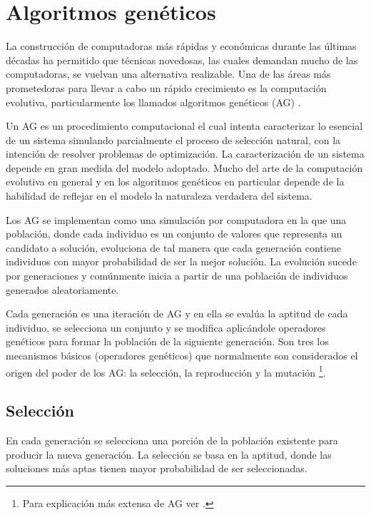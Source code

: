 \section{Algoritmos gen\'eticos}
La construcci\'on de computadoras m\'as r\'apidas y econ\'omicas 
durante las \'ultimas d\'ecadas ha permitido que t\'ecnicas 
novedosas, las cuales demandan mucho de las computadoras, se vuelvan 
una alternativa realizable. Una de las \'areas m\'as prometedoras 
para llevar a cabo un r\'apido crecimiento es la computaci\'on 
evolutiva, particularmente los llamados algoritmos gen\'eticos (AG) 
\citep{Kur199901}.

Un AG es un procedimiento computacional el cual intenta caracterizar 
lo esencial de un sistema simulando parcialmente el proceso de 
selecci\'on natural, con la intenci\'on de resolver problemas de 
optimizaci\'on. La caracterizaci\'on de un sistema depende en gran 
medida del modelo adoptado. Mucho del arte de la computaci\'on 
evolutiva en general y en los algoritmos gen\'eticos en particular 
depende de la habilidad de reflejar en el modelo la naturaleza 
verdadera del sistema.

Los AG se implementan como una simulaci\'on por computadora en la que
una poblaci\'on, donde cada individuo es un conjunto de valores que 
representa un candidato a soluci\'on, evoluciona de tal manera que 
cada generaci\'on contiene individuos con mayor probabilidad de ser 
la mejor soluci\'on. La evoluci\'on sucede por generaciones y 
com\'unmente inicia a partir de una poblaci\'on de individuos 
generados aleatoriamente. 

Cada generaci\'on es una iteraci\'on de AG y en ella se eval\'ua la 
aptitud de cada individuo, se selecciona un conjunto y se modifica 
aplic\'andole operadores gen\'eticos para formar la poblaci\'on de la 
siguiente generaci\'on. Son tres los mecanismos b\'asicos (operadores 
gen\'eticos) que normalmente son considerados el origen del poder de
los AG: la selecci\'on, la reproducci\'on y la mutaci\'on 
\footnote{Para explicaci\'on m\'as extensa de AG ver 
\cite{Kur199901}.}.

\subsection{Selecci\'on}
En cada generaci\'on se selecciona una porci\'on de la poblaci\'on 
existente para producir la nueva generaci\'on. La selecci\'on se basa
en la aptitud, donde las soluciones m\'as aptas tienen mayor 
probabilidad de ser seleccionadas. 

